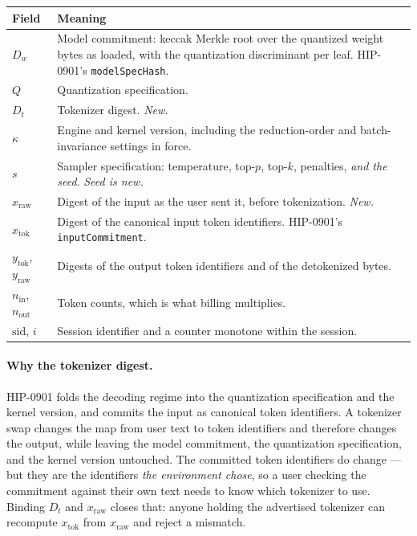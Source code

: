 \documentclass[11pt]{article}
\newcommand{\code}[1]{\texttt{#1}}
\begin{document}
\begin{center}
\small
\begin{tabular}{@{}lL{0.72\textwidth}@{}}
\toprule
Field & Meaning \\
\midrule
$D_w$ & Model commitment: keccak Merkle root over the quantized weight bytes as loaded, with the
quantization discriminant per leaf. HIP-0901's \code{modelSpecHash}. \\
$Q$ & Quantization specification. \\
$D_t$ & Tokenizer digest. \emph{New.} \\
$\kappa$ & Engine and kernel version, including the reduction-order and batch-invariance settings in
force. \\
$s$ & Sampler specification: temperature, top-$p$, top-$k$, penalties, \emph{and the seed}. \emph{Seed
is new.} \\
$x_{\text{raw}}$ & Digest of the input as the user sent it, before tokenization. \emph{New.} \\
$x_{\text{tok}}$ & Digest of the canonical input token identifiers. HIP-0901's \code{inputCommitment}. \\
$y_{\text{tok}}$, $y_{\text{raw}}$ & Digests of the output token identifiers and of the detokenized bytes. \\
$n_{\text{in}}$, $n_{\text{out}}$ & Token counts, which is what billing multiplies. \\
$\mathrm{sid}$, $i$ & Session identifier and a counter monotone within the session. \\
\bottomrule
\end{tabular}
\end{center}

\paragraph{Why the tokenizer digest.}
HIP-0901 folds the decoding regime into the quantization specification and the kernel version, and
commits the input as canonical token identifiers. A tokenizer swap changes the map from user text to
token identifiers and therefore changes the output, while leaving the model commitment, the
quantization specification, and the kernel version untouched. The committed token identifiers do
change --- but they are the identifiers \emph{the environment chose}, so a user checking the
commitment against their own text needs to know which tokenizer to use. Binding $D_t$ and
$x_{\text{raw}}$ closes that: anyone holding the advertised tokenizer can recompute $x_{\text{tok}}$
from $x_{\text{raw}}$ and reject a mismatch.
\end{document}
